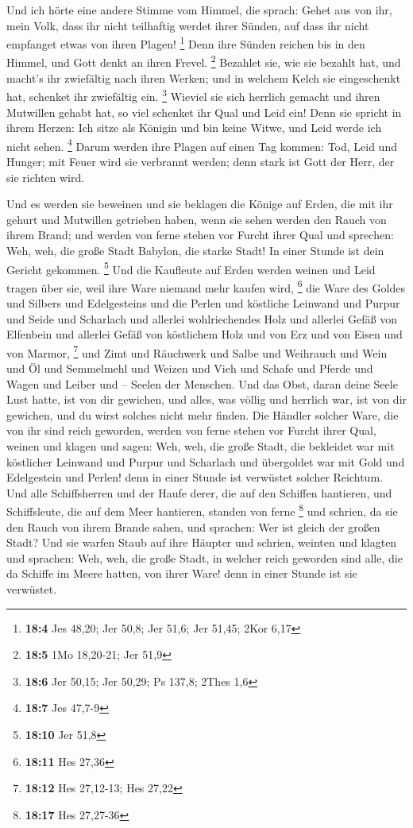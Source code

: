  Und ich hörte eine andere Stimme vom Himmel, die sprach:
Gehet aus von ihr, mein Volk, dass ihr nicht teilhaftig werdet ihrer
Sünden, auf dass ihr nicht empfanget etwas von ihren Plagen! \footnote{\textbf{18:4}
  Jes 48,20; Jer 50,8; Jer 51,6; Jer 51,45; 2Kor 6,17}  Denn
ihre Sünden reichen bis in den Himmel, und Gott denkt an ihren Frevel.
\footnote{\textbf{18:5} 1Mo 18,20-21; Jer 51,9}  Bezahlet
sie, wie sie bezahlt hat, und macht's ihr zwiefältig nach ihren Werken;
und in welchem Kelch sie eingeschenkt hat, schenket ihr zwiefältig ein.
\footnote{\textbf{18:6} Jer 50,15; Jer 50,29; Ps 137,8; 2Thes 1,6}
 Wieviel sie sich herrlich gemacht und ihren Mutwillen
gehabt hat, so viel schenket ihr Qual und Leid ein! Denn sie spricht in
ihrem Herzen: Ich sitze als Königin und bin keine Witwe, und Leid werde
ich nicht sehen. \footnote{\textbf{18:7} Jes 47,7-9}  Darum
werden ihre Plagen auf einen Tag kommen: Tod, Leid und Hunger; mit Feuer
wird sie verbrannt werden; denn stark ist Gott der Herr, der sie richten
wird.

 Und es werden sie beweinen und sie beklagen die Könige auf
Erden, die mit ihr gehurt und Mutwillen getrieben haben, wenn sie sehen
werden den Rauch von ihrem Brand;  und werden von ferne
stehen vor Furcht ihrer Qual und sprechen: Weh, weh, die große Stadt
Babylon, die starke Stadt! In einer Stunde ist dein Gericht gekommen.
\footnote{\textbf{18:10} Jer 51,8}  Und die Kaufleute auf
Erden werden weinen und Leid tragen über sie, weil ihre Ware niemand
mehr kaufen wird, \footnote{\textbf{18:11} Hes 27,36}  die
Ware des Goldes und Silbers und Edelgesteins und die Perlen und
köstliche Leinwand und Purpur und Seide und Scharlach und allerlei
wohlriechendes Holz und allerlei Gefäß von Elfenbein und allerlei Gefäß
von köstlichem Holz und von Erz und von Eisen und von Marmor,
\footnote{\textbf{18:12} Hes 27,12-13; Hes 27,22}  und Zimt
und Räuchwerk und Salbe und Weihrauch und Wein und Öl und Semmelmehl und
Weizen und Vieh und Schafe und Pferde und Wagen und Leiber und -- Seelen
der Menschen.  Und das Obst, daran deine Seele Lust hatte,
ist von dir gewichen, und alles, was völlig und herrlich war, ist von
dir gewichen, und du wirst solches nicht mehr finden.  Die
Händler solcher Ware, die von ihr sind reich geworden, werden von ferne
stehen vor Furcht ihrer Qual, weinen und klagen  und sagen:
Weh, weh, die große Stadt, die bekleidet war mit köstlicher Leinwand und
Purpur und Scharlach und übergoldet war mit Gold und Edelgestein und
Perlen!  denn in einer Stunde ist verwüstet solcher
Reichtum. Und alle Schiffsherren und der Haufe derer, die auf den
Schiffen hantieren, und Schiffsleute, die auf dem Meer hantieren,
standen von ferne \footnote{\textbf{18:17} Hes 27,27-36} 
und schrien, da sie den Rauch von ihrem Brande sahen, und sprachen: Wer
ist gleich der großen Stadt?  Und sie warfen Staub auf ihre
Häupter und schrien, weinten und klagten und sprachen: Weh, weh, die
große Stadt, in welcher reich geworden sind alle, die da Schiffe im
Meere hatten, von ihrer Ware! denn in einer Stunde ist sie verwüstet.

